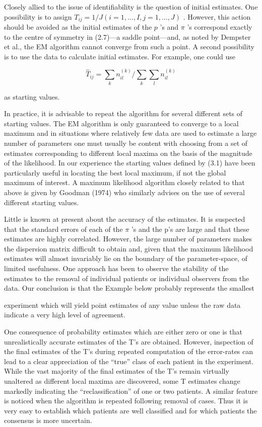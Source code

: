 \documentclass[
]{article}
\begin{document}
Closely allied to the issue of identifiability is the question of
initial estimates. One possibility is to assign
\(T_{ij} = 1 / J (i = 1, \dots, I, j = 1, \dots, J)\) . However, this
action should be avoided as the initial estimates of the \(p\) 's and
\(\pi\) 's correspond exactly to the centre of symmetry in (2.7)---a
saddle point---and, as noted by Dempster et al., the EM algorithm cannot
converge from such a point. A second possibility is to use the data to
calculate initial estimates. For example, one could use

\[
\hat {T} _ {i j} = \sum_ {k} n _ {i l} ^ {(k)} / \sum_ {k} \sum_ {l} n _ {i l} ^ {(k)} \tag {3.1}
\]

as starting values.

In practice, it is advisable to repeat the algorithm for several
different sets of starting values. The EM algorithm is only guaranteed
to converge to a local maximum and in situations where relatively few
data are used to estimate a large number of parameters one must usually
be content with choosing from a set of estimates corresponding to
different local maxima on the basis of the magnitude of the likelihood.
In our experience the starting values defined by (3.1) have been
particularly useful in locating the best local maximum, if not the
global maximum of interest. A maximum likelihood algorithm closely
related to that above is given by Goodman (1974) who similarly advises
on the use of several different starting values.

Little is known at present about the accuracy of the estimates. It is
suspected that the standard errors of each of the \(\pi\) 's and the p's
are large and that these estimates are highly correlated. However, the
large number of parameters makes the dispersion matrix difficult to
obtain and, given that the maximum likelihood estimates will almost
invariably lie on the boundary of the parameter-space, of limited
usefulness. One approach has been to observe the stability of the
estimates to the removal of individual patients or individual observers
from the data. Our conclusion is that the Example below probably
represents the smallest

experiment which will yield point estimates of any value unless the raw
data indicate a very high level of agreement.

One consequence of probability estimates which are either zero or one is
that unrealistically accurate estimates of the T's are obtained.
However, inspection of the final estimates of the T's during repeated
computation of the error-rates can lead to a clear appreciation of the
``true'' class of each patient in the experiment. While the vast
majority of the final estimates of the T's remain virtually unaltered as
different local maxima are discovered, some T estimates change markedly
indicating the ``reclassification'' of one or two patients. A similar
feature is noticed when the algorithm is repeated following removal of
cases. Thus it is very easy to establish which patients are well
classified and for which patients the consensus is more uncertain.
\end{document}
